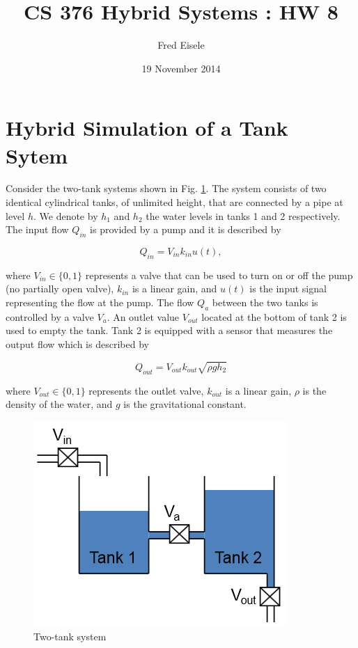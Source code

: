 \documentclass[letterpaper]{article}
\title{CS 376 Hybrid Systems : HW 8}
\author{Fred Eisele}
\date{19 November 2014}
\begin{document}
\maketitle

\section{Hybrid Simulation of a Tank Sytem}
Consider the two-tank systems shown in Fig. \ref{fig:two-tanks}.
The system consists of two identical cylindrical tanks,
of unlimited height,
that are connected by a pipe at level $h$.
We denote by $h_1$ and $h_2$ the water levels in 
tanks 1 and 2 respectively.
The input flow $Q_{in}$ is provided by a pump and
it is described by 

\begin{equation}
Q_{in} = V_{in} k_{in} u(t),
\end{equation}

where $V_{in} \in \{0, 1\}$ represents a valve that can be
used to turn on or off the pump (no partially open valve),
$k_{in}$ is a linear gain, and $u(t)$ is the input
signal representing the flow at the pump.
The flow $Q_a$ between the two tanks is controlled by
a valve $V_a$. An outlet value $V_{out}$ located at the
bottom of tank 2 is used to empty the tank.
Tank 2 is equipped with a sensor that measures the output
flow which is described by 

\begin{equation}
Q_{out} = V_{out} k_{out} \sqrt{\rho g h_{2}}
\end{equation}

where $V_{out} \in \{0, 1\}$ represents the outlet valve,
$k_{out}$ is a linear gain, $\rho$ is the density of 
the water, and $g$ is the gravitational constant.

\begin{figure}[h!]
\centering
\includegraphics[scale=0.7]{hw8_two_tank_system.png}
\caption{Two-tank system}
\label{fig:two-tanks}
\end{figure}
\end{document}
